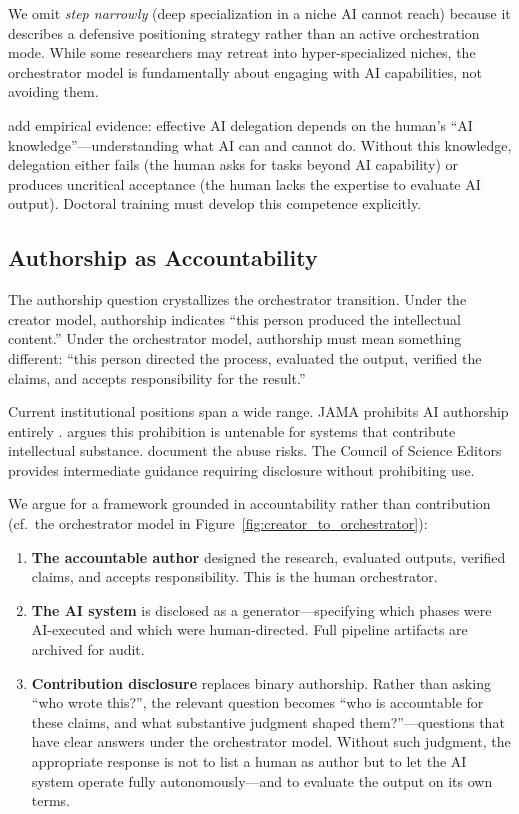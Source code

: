 \documentclass{article}
\begin{document}
We omit \textit{step narrowly} (deep specialization in a niche AI cannot reach) because it describes a defensive positioning strategy rather than an active orchestration mode. While some researchers may retreat into hyper-specialized niches, the orchestrator model is fundamentally about engaging with AI capabilities, not avoiding them.

\citet{pinski2023delegation} add empirical evidence: effective AI delegation depends on the human's ``AI knowledge''---understanding what AI can and cannot do. Without this knowledge, delegation either fails (the human asks for tasks beyond AI capability) or produces uncritical acceptance (the human lacks the expertise to evaluate AI output). Doctoral training must develop this competence explicitly.

\subsection{Authorship as Accountability}

The authorship question crystallizes the orchestrator transition. Under the creator model, authorship indicates ``this person produced the intellectual content.'' Under the orchestrator model, authorship must mean something different: ``this person directed the process, evaluated the output, verified the claims, and accepts responsibility for the result.''

Current institutional positions span a wide range. JAMA prohibits AI authorship entirely \citep{flanagin2023nonhuman}. \citet{abernethy2025parrots} argues this prohibition is untenable for systems that contribute intellectual substance. \citet{kendall2024risks} document the abuse risks. The Council of Science Editors \citep{jackson2023cse} provides intermediate guidance requiring disclosure without prohibiting use.

We argue for a framework grounded in accountability rather than contribution (cf.\ the orchestrator model in Figure~\ref{fig:creator_to_orchestrator}):

\begin{enumerate}
  \item \textbf{The accountable author} designed the research, evaluated outputs, verified claims, and accepts responsibility. This is the human orchestrator.
  \item \textbf{The AI system} is disclosed as a generator---specifying which phases were AI-executed and which were human-directed. Full pipeline artifacts are archived for audit.
  \item \textbf{Contribution disclosure} replaces binary authorship. Rather than asking ``who wrote this?'', the relevant question becomes ``who is accountable for these claims, and what substantive judgment shaped them?''---questions that have clear answers under the orchestrator model. Without such judgment, the appropriate response is not to list a human as author but to let the AI system operate fully autonomously---and to evaluate the output on its own terms.
\end{enumerate}
\end{document}
